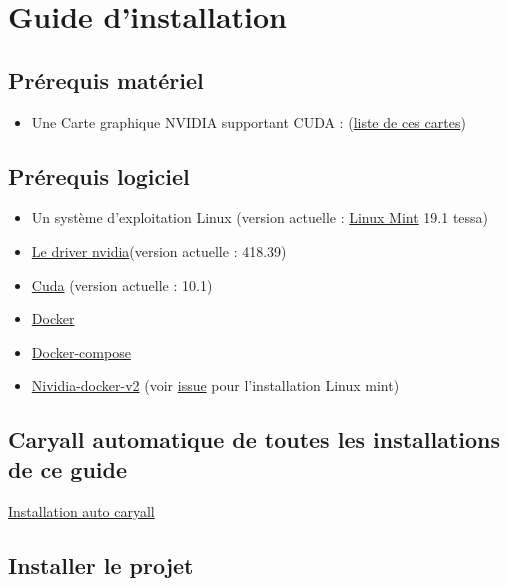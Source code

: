 \documentclass[debug,nodate,hideweeklyreports]{polytech/polytech}
\begin{document}
\chapter{Guide d'installation}
\label{ann:guideinstallation}

\section{Prérequis matériel}

\begin{itemize}
\item Une Carte graphique NVIDIA supportant CUDA : (\href{https://www.geforce.com/hardware/technology/cuda/supported-gpus}{liste de ces cartes})
\end{itemize}

\section{Prérequis logiciel}

\begin{itemize}
\item Un système d'exploitation Linux (version actuelle : \href{https://linuxmint.com/download.php}{Linux Mint} 19.1 tessa)
\item \href{https://www.nvidia.fr/Download/index.aspx}{Le driver nvidia}(version actuelle : 418.39)
\item \href{https://developer.nvidia.com/cuda-downloads}{Cuda} (version actuelle : 10.1)
\item \href{https://docs.docker.com/install/}{Docker}
\item \href{https://github.com/docker/compose/releases}{Docker-compose}
\item \href{https://github.com/nvidia/nvidia-docker/wiki/Installation-(version-2.0)}{Nividia-docker-v2} (voir \href{https://github.com/NVIDIA/nvidia-docker/issues/848}{issue} pour l'installation Linux mint)
\end{itemize}

\section{Caryall automatique de toutes les installations de ce guide}

\href{https://github.com/JulienCheny/ImageTagging/wiki/Installation-auto-caryall}{Installation auto caryall}

\section{Installer le projet}
\end{document}
